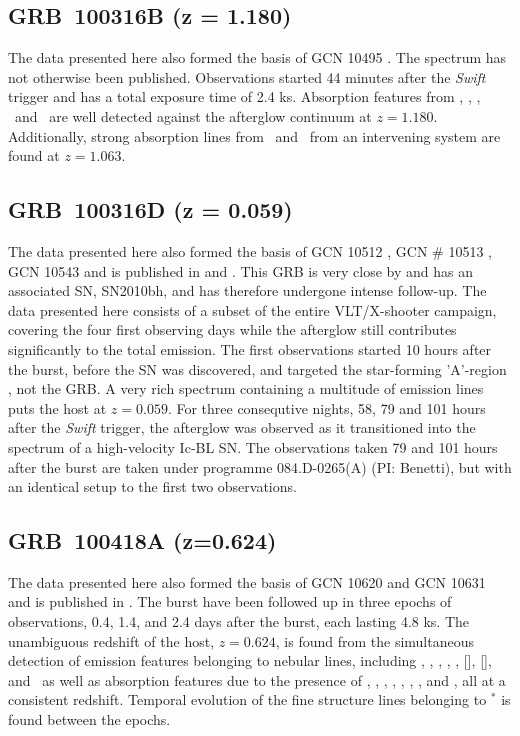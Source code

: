 \documentclass{aa}    %
\begin{document}
\subsection{GRB~100316B (z = 1.180)} \label{100316}

The data presented here also formed the basis of GCN 10495 \citep{GCN10495}. The spectrum
has not otherwise been published. Observations started 44 minutes
after the \textit{Swift} trigger and has a total exposure time of 2.4 ks.
Absorption features from \feii, \alii, \aliii,	\mgii~and \mgi~are well detected
against the afterglow continuum at $z = 1.180$. Additionally, strong absorption
lines from \feii~and \mgii~from an intervening system are found at $z = 1.063$.

\subsection{GRB~100316D (z = 0.059)} \label{100316}

The data presented here also formed the basis of GCN 10512 \citep{GCN10512}, GCN
\# 10513 \citep{GCN10513}, GCN 10543 \citep{GCN10543} and is published in
\citet{Bufano2012} and \citet{Starling2011}. This GRB is very close by and has
an associated SN, SN2010bh, and has therefore undergone intense follow-up. The
data presented here consists of a subset of the entire VLT/X-shooter campaign,
covering the four first observing days while the afterglow still contributes
significantly to the total emission. The first observations started 10 hours
after the burst, before the SN was discovered, and targeted the star-forming
'A'-region \citep{Starling2011}, not the GRB. A very rich spectrum containing a
multitude of emission lines puts the host at $z = 0.059$. For three consequtive
nights, 58, 79 and 101 hours after the \textit{Swift} trigger, the afterglow was
observed as it transitioned into the spectrum of a high-velocity Ic-BL SN. The
observations taken 79 and 101 hours after the burst are taken under programme
084.D-0265(A) (PI: Benetti), but with an identical setup to the first two
observations.

\subsection{GRB~100418A (z=0.624)} \label{100418}

The data presented here also formed the basis of GCN 10620 \citep{GCN10620} and GCN 10631 \citep{GCN10631} and is published
in \citet{DeUgartePostigo2011}. The burst have been followed up in three epochs
of observations, 0.4, 1.4, and 2.4 days after the burst, each lasting 4.8 ks.
The unambiguous redshift of the host, $z=0.624$, is found from the simultaneous
detection of emission features belonging to nebular lines, including \hi, \oii,
\oiii, \neiii, \nii, [\sii], [\siii], and \hei~as well as absorption features due to
the presence of \znii, \crii, \feii, \mnii, \mgii, \mgi, \tiii, and \caii, all
at a consistent redshift. Temporal evolution of the fine structure lines
belonging to \feii$^*$ is found between the epochs.
\end{document}
